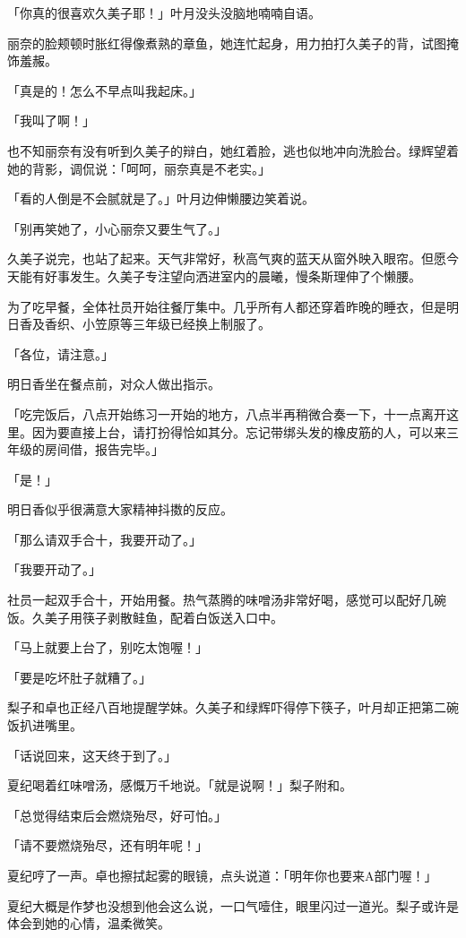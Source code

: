 \documentclass[UTF8]{ctexart}
\begin{document}
    「你真的很喜欢久美子耶！」叶月没头没脑地喃喃自语。 

    丽奈的脸颊顿时胀红得像煮熟的章鱼，她连忙起身，用力拍打久美子的背，试图掩饰羞赧。 

    「真是的！怎么不早点叫我起床。」 

    「我叫了啊！」 

    也不知丽奈有没有听到久美子的辩白，她红着脸，逃也似地冲向洗脸台。绿辉望着她的背影，调侃说：「呵呵，丽奈真是不老实。」 

    「看的人倒是不会腻就是了。」叶月边伸懒腰边笑着说。 

    「别再笑她了，小心丽奈又要生气了。」 

    久美子说完，也站了起来。天气非常好，秋高气爽的蓝天从窗外映入眼帘。但愿今天能有好事发生。久美子专注望向洒进室内的晨曦，慢条斯理伸了个懒腰。 

    为了吃早餐，全体社员开始往餐厅集中。几乎所有人都还穿着昨晚的睡衣，但是明日香及香织、小笠原等三年级已经换上制服了。 

    「各位，请注意。」 

    明日香坐在餐点前，对众人做出指示。 

    「吃完饭后，八点开始练习一开始的地方，八点半再稍微合奏一下，十一点离开这里。因为要直接上台，请打扮得恰如其分。忘记带绑头发的橡皮筋的人，可以来三年级的房间借，报告完毕。」 

    「是！」 

    明日香似乎很满意大家精神抖擞的反应。 

    「那么请双手合十，我要开动了。」 

    「我要开动了。」 

    社员一起双手合十，开始用餐。热气蒸腾的味噌汤非常好喝，感觉可以配好几碗饭。久美子用筷子剥散鲑鱼，配着白饭送入口中。 

    「马上就要上台了，别吃太饱喔！」 

    「要是吃坏肚子就糟了。」 

    梨子和卓也正经八百地提醒学妹。久美子和绿辉吓得停下筷子，叶月却正把第二碗饭扒进嘴里。 

    「话说回来，这天终于到了。」 

    夏纪喝着红味噌汤，感慨万千地说。「就是说啊！」梨子附和。 

    「总觉得结束后会燃烧殆尽，好可怕。」 

    「请不要燃烧殆尽，还有明年呢！」 

    夏纪哼了一声。卓也擦拭起雾的眼镜，点头说道：「明年你也要来A部门喔！」 

    夏纪大概是作梦也没想到他会这么说，一口气噎住，眼里闪过一道光。梨子或许是体会到她的心情，温柔微笑。 
\end{document}
